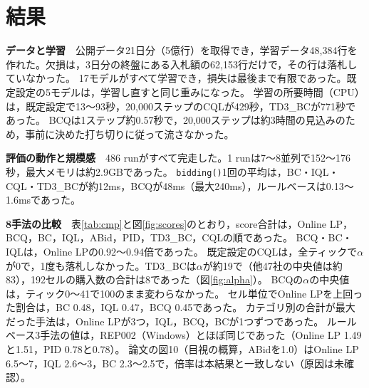 \documentclass[twocolumn, 10pt]{ujarticle}
\begin{document}
\section{結果}\label{sec:e-result}

\textbf{データと学習}　公開データ21日分（5億行）を取得でき，学習データ48,384行を作れた。欠損は，3日分の終盤にある入札額の62,153行だけで，その行は落札していなかった。
17モデルがすべて学習でき，損失は最後まで有限であった。既定設定の5モデルは，学習し直すと同じ重みになった。
学習の所要時間（CPU）は，既定設定で13〜93秒，20,000ステップのCQLが429秒，TD3\_BCが771秒であった。
BCQは1ステップ約0.57秒で，20,000ステップは約3時間の見込みのため，事前に決めた打ち切りに従って流さなかった。

\textbf{評価の動作と規模感}　486 runがすべて完走した。1 runは7〜8並列で152〜176秒，最大メモリは約2.9GBであった。
\texttt{bidding()}1回の平均は，BC・IQL・CQL・TD3\_BCが約12ms，BCQが48ms（最大240ms），ルールベースは0.13〜1.6msであった。

\textbf{8手法の比較}　表\ref{tab:cmp}と図\ref{fig:scores}のとおり，score合計は，Online LP，BCQ，BC，IQL，ABid，PID，TD3\_BC，CQLの順であった。
BCQ・BC・IQLは，Online LPの0.92〜0.94倍であった。
既定設定のCQLは，全ティックで$\alpha$が0で，1度も落札しなかった。TD3\_BCは$\alpha$が約19で（他47社の中央値は約83），192セルの購入数の合計は8であった（図\ref{fig:alpha}）。
BCQの$\alpha$の中央値は，ティック0〜41で100のまま変わらなかった。
セル単位でOnline LPを上回った割合は，BC 0.48，IQL 0.47，BCQ 0.45であった。
カテゴリ別の合計が最大だった手法は，Online LPが3つ，IQL，BCQ，BCが1つずつであった。
ルールベース3手法の値は，REP002（Windows）とほぼ同じであった（Online LP 1.49と1.51，PID 0.78と0.78）。
論文の図10（目視の概算，ABidを1.0）はOnline LP 6.5〜7，IQL 2.6〜3，BC 2.3〜2.5で，倍率は本結果と一致しない（原因は未確認）。
\end{document}
